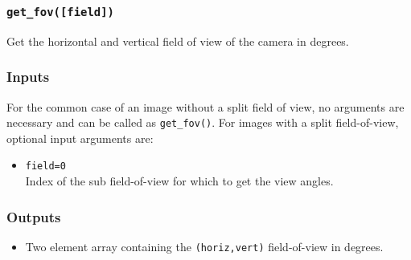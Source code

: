 \documentclass[12pt]{article}
\newcommand{\code}[1]{\texttt{#1}}
\begin{document}
\subsubsection*{\code{get\_fov([field])}}
\begin{adjustwidth}{0.5cm}{0cm}
Get the horizontal and vertical field of view of the camera in degrees. 
\subsubsection*{Inputs}
For the common case of an image without a split field of view, no arguments are necessary and can be called as \code{get\_fov()}. For images with a split field-of-view, optional input arguments are:
\begin{itemize}
\item{\code{field=0}\\Index of the sub field-of-view for which to get the view angles.}
\end{itemize}
\subsubsection*{Outputs} 
\begin{itemize}
\item{Two element array containing the \code{(horiz,vert)} field-of-view in degrees.}
\end{itemize}
\end{adjustwidth}
\end{document}
